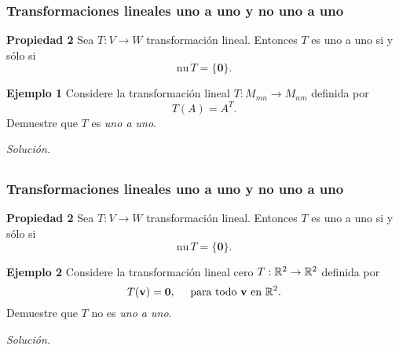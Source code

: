 \begin{frame}\frametitle{Transformaciones lineales uno a uno y no uno a uno}
	
	\begin{prop}{\textbf{Propiedad 2}}
		\justifying
		Sea $T:V\to W$ transformación lineal. Entonces $T$ es uno a uno si y sólo si 
		\[
		\text{nu}\,T=\{\mathbf{0}\}.
		\]
	\end{prop}	
	
	\begin{ej}{\textbf{Ejemplo 1}}
		\justifying
		Considere la transformación lineal  $T:M_{mn}\to M_{nm}$ definida por 
		\[
		T(A) = A^T.
		\]
		Demuestre que $T$ es \textit{uno a uno}.
		
	\end{ej}
	\textit{Solución.}
	
\end{frame}


\subsection{}

{\nologo 
\begin{frame}\frametitle{Transformaciones lineales uno a uno y no uno a uno}

\begin{prop}{\textbf{Propiedad 2}}
	\justifying
	Sea $T:V\to W$ transformación lineal. Entonces $T$ es uno a uno si y sólo si 
	\[
	\text{nu}\,T=\{\mathbf{0}\}.
	\]
\end{prop}	

\begin{ej}{\textbf{Ejemplo 2}}
	\justifying
	Considere la transformación lineal cero $T:\mathbb{R}^2\to \mathbb{R}^2$ definida por
	\[
	T(\mathbf{v}) = \mathbf{0}, \quad \text{ para todo } \mathbf{v} \text{ en } \mathbb{R}^2.
	\]
	Demuestre que $T$ no es \textit{uno a uno}.
\end{ej}
\textit{Solución.}

\end{frame}
}


\subsection{}

